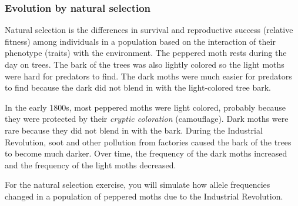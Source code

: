 \documentclass[12pt]{exam}
\begin{document}
%  
%  
%
%
\subsubsection*{Evolution by natural selection}\label{sec:natural_selection}

Natural selection is the differences in survival and reproductive success (relative fitness) among individuals in a population based on the interaction of their phenotype (traits) with the environment. The peppered moth rests during the day on trees. The bark of the trees was also lightly colored so the light moths were hard for predators to find. The dark moths were much easier for predators to find because the dark did not blend in with the light-colored tree bark. 

In the early 1800s, most peppered moths were light colored, probably because they were protected by their \emph{cryptic coloration} (camouflage). Dark moths were rare because they did not blend in with the bark. During the Industrial Revolution, soot and other pollution from factories caused the bark of the trees to become much darker. Over time, the frequency of the dark moths increased and the frequency of the light moths decreased. 

For the natural selection exercise, you will simulate how allele frequencies changed in a population of peppered moths due to the Industrial Revolution. 
\end{document}
